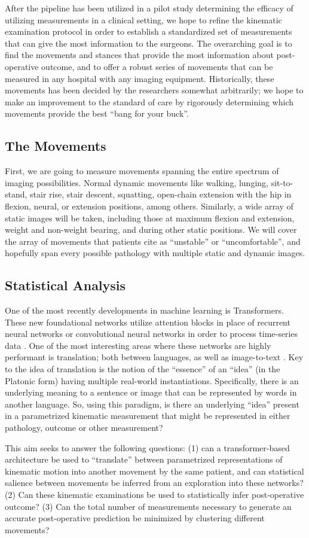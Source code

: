 After the pipeline has been utilized in a pilot study determining the efficacy of utilizing measurements in a clinical setting, we hope to refine the kinematic examination protocol in order to establish a standardized set of measurements that can give the most information to the surgeons. The overarching goal is to find the movements and stances that provide the most information about post-operative outcome, and to offer a robust series of movements that can be measured in any hospital with any imaging equipment. Historically, these movements has been decided by the researchers somewhat arbitrarily; we hope to make an improvement to the standard of care by rigorously determining which movements provide the best ``bang for your buck''.

\subsection{The Movements}
First, we are going to measure movements spanning the entire spectrum of imaging possibilities. Normal dynamic movements like walking, lunging, sit-to-stand, stair rise, stair descent, squatting, open-chain extension with the hip in flexion, neural, or extension positions, among others. Similarly, a wide array of static images will be taken, including those at maximum flexion and extension, weight and non-weight bearing, and during other static positions. We will cover the array of movements that patients cite as ``unstable'' or ``uncomfortable'', and hopefully span every possible pathology with multiple static and dynamic images.

\subsection{Statistical Analysis}

One of the most recently developments in machine learning is Transformers. These new foundational networks utilize attention blocks in place of recurrent neural networks or convolutional neural networks in order to process time-series data \cite{vaswaniAttentionAllYou2017}. One of the most interesting areas where these networks are highly performant is translation; both between languages, as well as image-to-text \cite{dosovitskiyImageWorth16x162021}. Key to the idea of translation is the notion of the ``essence'' of an ``idea'' (in the Platonic form) having multiple real-world instantiations. Specifically, there is an underlying meaning to a sentence or image that can be represented by words in another language. So, using this paradigm, is there an underlying ``idea'' present in a parametrized kinematic measurement that might be represented in either pathology, outcome or other measurement?

This aim seeks to answer the following questions: (1) can a transformer-based architecture be used to ``translate'' between parametrized representations of kinematic motion into another movement by the same patient, and can statistical salience between movements be inferred from an exploration into these networks? (2) Can these kinematic examinations be used to statistically infer post-operative outcome? (3) Can the total number of measurements necessary to generate an accurate post-operative prediction be minimized by clustering different movements?
